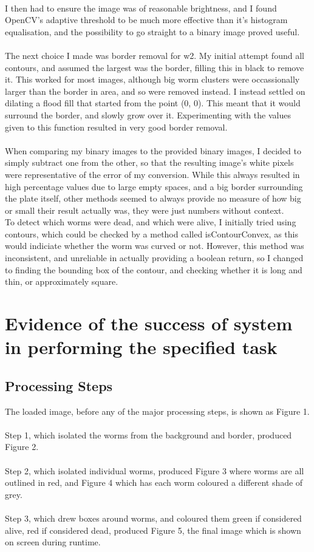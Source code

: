 \documentclass[a4paper,12pt]{article}
\begin{document}
\\
I then had to ensure the image was of reasonable brightness, and I found OpenCV's adaptive threshold to be much more effective than it's histogram equalisation, and the possibility to go straight to a binary image proved useful.
\\\\
The next choice I made was border removal for w2. My initial attempt found all contours, and assumed the largest was the border, filling this in black to remove it. This worked for most images, although big worm clusters were occassionally larger than the border in area, and so were removed instead. I instead settled on dilating a flood fill that started from the point (0, 0). This meant that it would surround the border, and slowly grow over it. Experimenting with the values given to this function resulted in very good border removal.
\\\\
When comparing my binary images to the provided binary images, I decided to simply subtract one from the other, so that the resulting image's white pixels were representative of the error of my conversion. While this always resulted in high percentage values due to large empty spaces, and a big border surrounding the plate itself, other methods seemed to always provide no measure of how big or small their result actually was, they were just numbers without context.
\\
To detect which worms were dead, and which were alive, I initially tried using contours, which could be checked by a method called isContourConvex, as this would indiciate whether the worm was curved or not. However, this method was inconsistent, and unreliable in actually providing a boolean return, so I changed to finding the bounding box of the contour, and checking whether it is long and thin, or approximately square.

\section*{Evidence of the success of system in performing the specified task}
\subsection*{Processing Steps}
The loaded image, before any of the major processing steps, is shown as Figure 1.
\\\\
Step 1, which isolated the worms from the background and border, produced Figure 2.
\\\\
Step 2, which isolated individual worms, produced Figure 3 where worms are all outlined in red, and Figure 4 which has each worm coloured a different shade of grey.
\\\\
Step 3, which drew boxes around worms, and coloured them green if considered alive, red if considered dead, produced Figure 5, the final image which is shown on screen during runtime.
\end{document}
